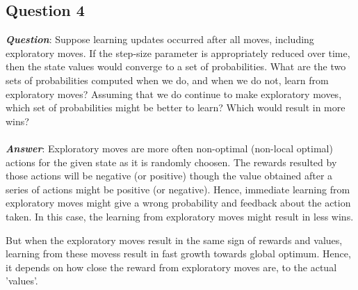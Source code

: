 \documentclass[a4paper,10pt]{report}
\begin{document}
\subsection{Question 4}
\textbf{\emph{Question}}: Suppose learning updates occurred after all moves, including exploratory moves. If the step-size parameter is appropriately reduced over time, then the state values would converge to a set of probabilities. What are the two sets of probabilities computed when we do, and when we do not, learn from exploratory moves? Assuming that we do continue to make exploratory moves, which set of probabilities might be better to learn? Which would result in more wins?
\\\\
\textbf{\emph{Answer}}: Exploratory moves are more often non-optimal (non-local optimal) actions for the given state as it is randomly choosen. The rewards resulted by those actions will be negative (or positive) though the value obtained after a series of actions might be positive (or negative). Hence, immediate learning from exploratory moves might give a wrong probability and feedback about the action taken. In this case, the learning from exploratory moves might result in less wins. 

But when the exploratory moves result in the same sign of rewards and values, learning from these movess result in fast growth towards global optimum. Hence, it depends on how close the reward from exploratory moves are, to the actual 'values'.
\pagebreak
\end{document}
